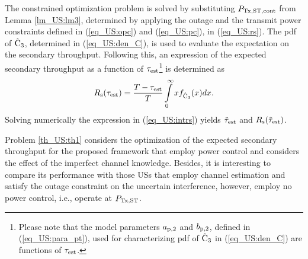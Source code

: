 \begin{IEEEproof}
The constrained optimization problem is solved by substituting $P_{\text{Tx,ST,cont}}$ from Lemma \ref{lm_US:lm3}, determined by applying the outage and the transmit power constraints defined in (\ref{eq_US:opc}) and (\ref{eq_US:pc}), in (\ref{eq_US:rs}). 
The pdf of $\hat{\text{{C}}}_{\text{3}}$, determined in (\ref{eq_US:den_C}), is used to evaluate the expectation on the secondary throughput. Following this, an expression of the expected secondary throughput as a function of $\tau_{\text{est}}$\footnote{Please note that the model parameters $a_{\text{p,2}}$ and $b_{\text{p,2}}$, defined in (\ref{eq_US:para_pt}), used for characterizing pdf of $\hat{\text{{C}}}_{\text{3}}$ in (\ref{eq_US:den_C}) are functions of $\tau_{\text{est}}$.} is determined as
\begin{equation}
R_{\text{s}}(\tau_{\text{est}}) = \frac{T - \tau_{\text{est}}}{T} \int\limits_{0}^{\infty} x f_{\hat{\text{{C}}}_{\text{3}}}(x) dx. \label{eq_US:intrs}
\end{equation}
Solving numerically the expression in (\ref{eq_US:intrs}) yields $\tilde{\tau}_{\text{est}}$ and $R_{\text{s}}(\tilde{\tau}_{\text{est}})$. 
\end{IEEEproof}
\begin{coro} \label{cor_US:cor2}
\normalfont
Problem \ref{th_US:th1} considers the optimization of the expected secondary throughput for the proposed framework that employ power control and considers the effect of the imperfect channel knowledge.  Besides, it is interesting to compare its performance with those USs that employ channel estimation and satisfy the outage constraint on the uncertain interference, however, employ no power control, i.e., operate at $P_{\text{Tx,ST}}$. 
\end{coro}


